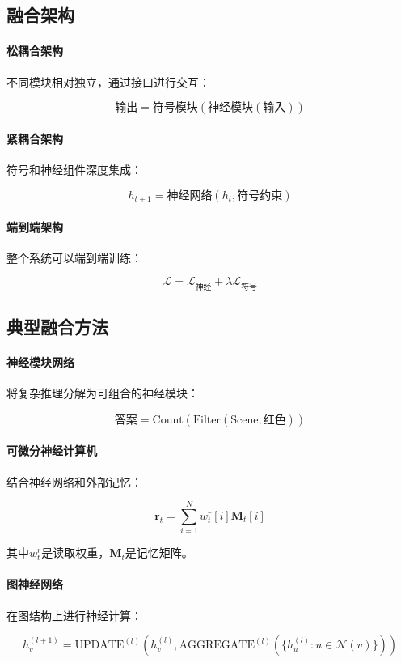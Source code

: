 \subsection{融合架构}

\paragraph{松耦合架构}
不同模块相对独立，通过接口进行交互：

$$\text{输出} = \text{符号模块}(\text{神经模块}(\text{输入}))$$

\paragraph{紧耦合架构}
符号和神经组件深度集成：

$$h_{t+1} = \text{神经网络}(h_t, \text{符号约束})$$

\paragraph{端到端架构}
整个系统可以端到端训练：

$$\mathcal{L} = \mathcal{L}_{\text{神经}} + \lambda \mathcal{L}_{\text{符号}}$$

\subsection{典型融合方法}

\paragraph{神经模块网络}
将复杂推理分解为可组合的神经模块：

$$\text{答案} = \text{Count}(\text{Filter}(\text{Scene}, \text{红色}))$$

\paragraph{可微分神经计算机}
结合神经网络和外部记忆：

$$\mathbf{r}_t = \sum_{i=1}^{N} w_t^r[i] \mathbf{M}_t[i]$$

其中$w_t^r$是读取权重，$\mathbf{M}_t$是记忆矩阵。

\paragraph{图神经网络}
在图结构上进行神经计算：

$$h_v^{(l+1)} = \text{UPDATE}^{(l)}\left(h_v^{(l)}, \text{AGGREGATE}^{(l)}\left(\{h_u^{(l)} : u \in \mathcal{N}(v)\}\right)\right)$$

